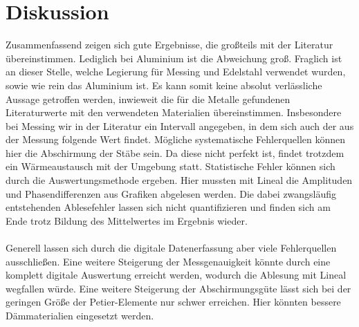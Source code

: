 \section{Diskussion}
Zusammenfassend zeigen sich gute Ergebnisse, die großteils mit der Literatur übereinstimmen. Lediglich bei Aluminium ist die Abweichung groß. Fraglich ist an dieser Stelle, welche Legierung für Messing und Edelstahl verwendet wurden, sowie wie rein das Aluminium ist. Es kann somit
keine absolut verlässliche Aussage getroffen werden, inwieweit die für die Metalle gefundenen Literaturwerte mit den verwendeten Materialien übereinstimmen. Insbesondere bei Messing
wir in der Literatur ein Intervall angegeben, in dem sich auch der aus der Messung folgende Wert findet.
Mögliche systematische Fehlerquellen können hier die Abschirmung der Stäbe sein. Da diese nicht perfekt ist, findet trotzdem
ein Wärmeaustausch mit der Umgebung statt. Statistische Fehler können sich durch die Auswertungsmethode ergeben. Hier mussten
mit Lineal die Amplituden und Phasendifferenzen aus Grafiken abgelesen werden. Die dabei zwangsläufig entstehenden Ablesefehler lassen sich
nicht quantifizieren und finden sich am Ende trotz Bildung des Mittelwertes im Ergebnis wieder.
\\
\\
Generell lassen sich durch die digitale Datenerfassung aber viele Fehlerquellen ausschließen. Eine weitere Steigerung der Messgenauigkeit könnte
durch eine komplett digitale Auswertung erreicht werden, wodurch die Ablesung mit Lineal wegfallen würde. Eine weitere Steigerung der Abschirmungsgüte
lässt sich bei der geringen Größe der Petier-Elemente nur schwer erreichen. Hier könnten bessere Dämmaterialien eingesetzt werden.

\newpage
\nocite{*}
\printbibliography
